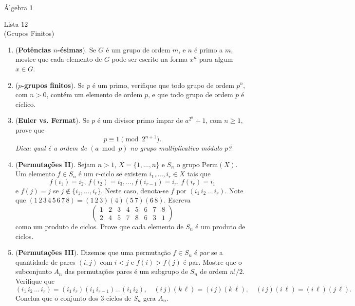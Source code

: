 \documentclass[a4paper,12pt]{article}
\begin{document}
\begin{center}
    \large Álgebra 1
\end{center}

\begin{center}
    \large Lista 12 \\
    \small (Grupos Finitos)
\end{center}
  
\begin{enumerate}[label=12.\arabic*.]

    \item (\textbf{Potências $n$-ésimas}). Se $G$ é um grupo de ordem $m$, e $n$ é primo a $m$, mostre que cada elemento de $G$ pode ser escrito na forma $x^n$ para algum $x \in G$. 

    \item (\textbf{$p$-grupos finitos}). Se $p$ é um primo, verifique que todo grupo de ordem $p^n$, com $n>0$, contém um elemento de ordem $p$, e que todo grupo de ordem $p$ é cíclico. 

    \item (\textbf{Euler vs. Fermat}). Se $p$ é um divisor primo ímpar de $a^{2^n}+1$, com $n \geq 1$, prove que 
    \[
    p \equiv 1 \pmod{2^{n+1}}.
    \] 
    \textit{Dica: qual é a ordem de $(a \bmod p)$ no grupo multiplicativo módulo $p$?} 

    \item (\textbf{Permutações II}). Sejam $n>1$, $X=\{1,\ldots,n\}$ e $S_n$ o grupo $\text{Perm}(X)$. Um elemento $f \in S_n$ é um $r$-ciclo se existem $i_1, \ldots, i_r \in X$ tais que 
    \[
    f(i_1)=i_2, \, f(i_2)=i_3, \ldots, f(i_{r-1})=i_r, \, f(i_r)=i_1
    \] 
    e $f(j)=j$ se $j \notin \{i_1,\ldots,i_r\}$. Neste caso, denota-se $f$ por $(i_1\,i_2\,\ldots\,i_r)$.  
    Note que $(1\,2\,3\,4\,5\,6\,7\,8) = (1\,2\,3)(4)(5\,7)(6\,8)$.  
    Escreva 
    \[
    \begin{pmatrix} 1&2&3&4&5&6&7&8 \\ 2&4&5&7&8&6&3&1 \end{pmatrix}
    \] 
    como um produto de ciclos. Prove que cada elemento de $S_n$ é um produto de ciclos.

    \item (\textbf{Permutações III}). Dizemos que uma permutação $f \in S_n$ é \textit{par} se a quantidade de pares $(i,j)$ com $i<j$ e $f(i)>f(j)$ é par. Mostre que o subconjunto $A_n$ das permutações pares é um subgrupo de $S_n$ de ordem $n!/2$.  
    Verifique que 
    \[
    (i_1\,i_2\,\ldots\, i_r) = (i_1\,i_r)(i_1\,i_{r-1})\ldots(i_1\,i_2), \quad 
    (i\,j)(k\,\ell) = (i\,j)(k\,\ell), \quad
    (i\,j)(i\,\ell)=(i\,\ell)(j\,\ell).
    \] 
    Conclua que o conjunto dos 3-ciclos de $S_n$ gera $A_n$.


\end{enumerate}
\end{document}
